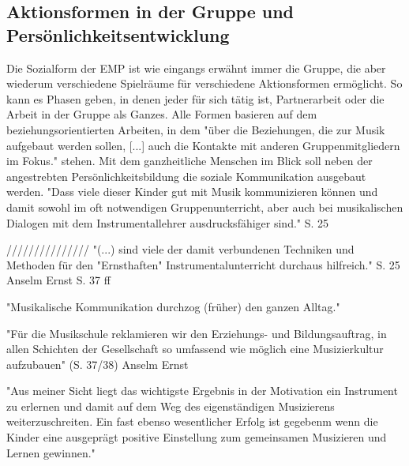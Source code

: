 \subsection{Aktionsformen in der Gruppe und Persönlichkeitsentwicklung}
Die Sozialform der EMP ist wie eingangs erwähnt immer die Gruppe, die aber
wiederum verschiedene Spielräume für verschiedene Aktionsformen ermöglicht. So
kann es Phasen geben, in denen jeder für sich tätig ist, Partnerarbeit oder die
Arbeit in der Gruppe als Ganzes. Alle Formen basieren auf dem beziehungsorientierten
Arbeiten, in dem "über die Beziehungen, die zur Musik aufgebaut werden sollen,
[...] auch die Kontakte mit anderen Gruppenmitgliedern im Fokus."
\autocite[10]{dartsch:kern_des_musizierens} stehen. Mit dem ganzheitliche Menschen im
Blick soll neben der angestrebten Persönlichkeitsbildung die soziale
Kommunikation ausgebaut werden.
"Dass viele dieser Kinder gut mit Musik kommunizieren können und damit sowohl im
oft notwendigen Gruppenunterricht, aber auch bei musikalischen Dialogen mit dem
Instrumentallehrer ausdrucksfähiger sind." S. 25%




///////////////
"(...) sind viele der damit verbundenen Techniken und Methoden für den
"Ernsthaften" Instrumentalunterricht durchaus hilfreich." S. 25
Anselm Ernst S. 37 ff

"Musikalische Kommunikation durchzog (früher) den ganzen Alltag."
\autocite[37]{ernst:die_zukunftsfaehige_musikschule}


"Für die Musikschule reklamieren wir den Erziehungs- und Bildungsauftrag, in
allen Schichten der Gesellschaft so umfassend wie möglich eine Musizierkultur
aufzubauen" (S. 37/38) Anselm Ernst

"Aus meiner Sicht liegt das wichtigste Ergebnis in der Motivation ein Instrument
zu erlernen und damit auf dem Weg des eigenständigen Musizierens
weiterzuschreiten. Ein fast ebenso wesentlicher Erfolg ist gegebenm wenn die
Kinder eine ausgeprägt positive Einstellung zum gemeinsamen Musizieren und
Lernen gewinnen." \autocite[40]{ernst:die_zukunftsfaehige_musikschule}

